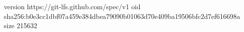 version https://git-lfs.github.com/spec/v1
oid sha256:b0e3cc1dbf07a459e384dbea79090b01063d70e409ba19506bfc2d7ef616698a
size 215632
